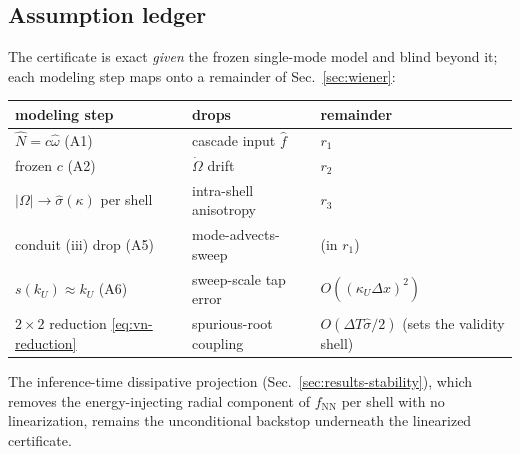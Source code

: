 \documentclass[11pt]{article}
\theoremstyle{plain}
\theoremstyle{definition}
\newcommand{\DT}{\Delta T}
\begin{document}
\subsection{Assumption ledger}

The certificate is exact \emph{given} the frozen single-mode model and
blind beyond it; each modeling step maps onto a remainder of Sec.~\ref{sec:wiener}:

\begin{center}
\begin{tabular}{lll}
\toprule
modeling step & drops & remainder \\
\midrule
$\hat N=c\hat\omega$ (A1) & cascade input $\hat f$ & $r_1$ \\
frozen $c$ (A2) & $\dot\Omega$ drift & $r_2$ \\
$|\Omega|\to\hat\sigma(\kappa)$ per shell & intra-shell anisotropy & $r_3$ \\
conduit (iii) drop (A5) & mode-advects-sweep & (in $r_1$) \\
$s(k_U)\approx k_U$ (A6) & sweep-scale tap error & $O((\kappa_U\Delta x)^2)$ \\
$2\times2$ reduction \eqref{eq:vn-reduction} & spurious-root coupling &
$O(\DT\hat\sigma/2)$ (sets the validity shell) \\
\bottomrule
\end{tabular}
\end{center}

\noindent The inference-time dissipative projection (Sec.~\ref{sec:results-stability}), which
removes the energy-injecting radial component of $f_{\mathrm{NN}}$ per
shell with no linearization, remains the unconditional backstop
underneath the linearized certificate.
\end{document}
